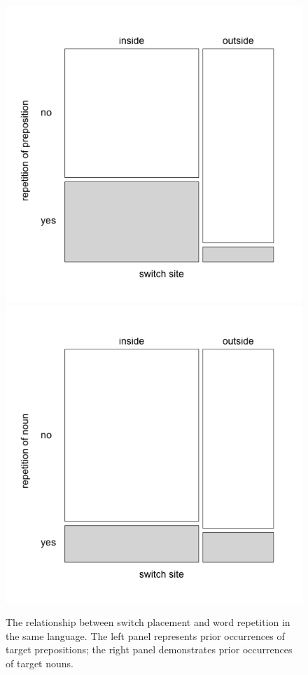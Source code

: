\begin{figure}
	\includegraphics[scale=0.3]{figures/5-Figure_4a.png}	%
	\includegraphics[scale=0.3]{figures/5-Figure_4b.png}	
		\caption{The relationship between switch placement and word repetition in the same language. The left panel represents prior occurrences of target prepositions; the right panel demonstrates prior occurrences of target nouns.}
	\label{fig:5:4}
\end{figure}

